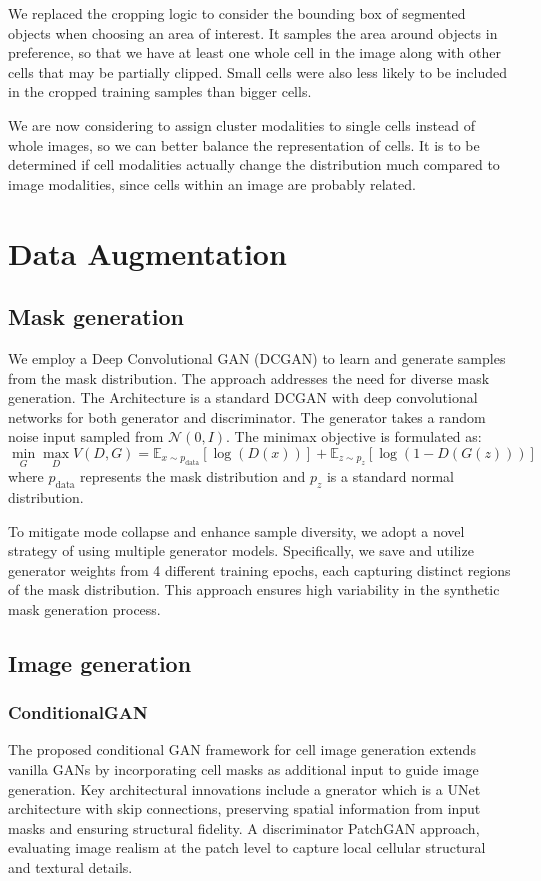 \documentclass[]{article}
\begin{document}
We replaced the cropping logic to consider the bounding box of segmented objects when choosing an area of interest. It samples the area around objects in preference, so that we have at least one whole cell in the image along with other cells that may be partially clipped. Small cells were also less likely to be included in the cropped training samples than bigger cells.

We are now considering to assign cluster modalities to single cells instead of whole images, so we can better balance the representation of cells. It is to be determined if cell modalities actually change the distribution much compared to image modalities, since cells within an image are probably related.

\section{Data Augmentation}
\subsection{Mask generation}
We employ a Deep Convolutional GAN (DCGAN) to learn and generate samples from the mask distribution. The approach addresses the need for diverse mask generation. The Architecture is a standard DCGAN with deep convolutional networks for both generator and discriminator. The generator takes a random noise input sampled from $\mathcal{N}(0, I)$. The minimax objective is formulated as:
\begin{equation}
\min_G \max_D V(D, G) = \mathbb{E}_{x \sim p_{\text{data}}}[\log(D(x))] + \mathbb{E}_{z \sim p_z}[\log(1 - D(G(z)))]
\end{equation}
where $p_{\text{data}}$ represents the mask distribution and $p_z$ is a standard normal distribution.

To mitigate mode collapse and enhance sample diversity, we adopt a novel strategy of using multiple generator models. Specifically, we save and utilize generator weights from 4 different training epochs, each capturing distinct regions of the mask distribution. This approach ensures high variability in the synthetic mask generation process.
\subsection{Image generation}
\subsubsection{ConditionalGAN}
The proposed conditional GAN framework for cell image generation extends vanilla GANs by incorporating cell masks as additional input to guide image generation. Key architectural innovations include a gnerator which is a UNet architecture with skip connections, preserving spatial information from input masks and ensuring structural fidelity. A discriminator PatchGAN approach, evaluating image realism at the patch level to capture local cellular structural and textural details.
\end{document}
